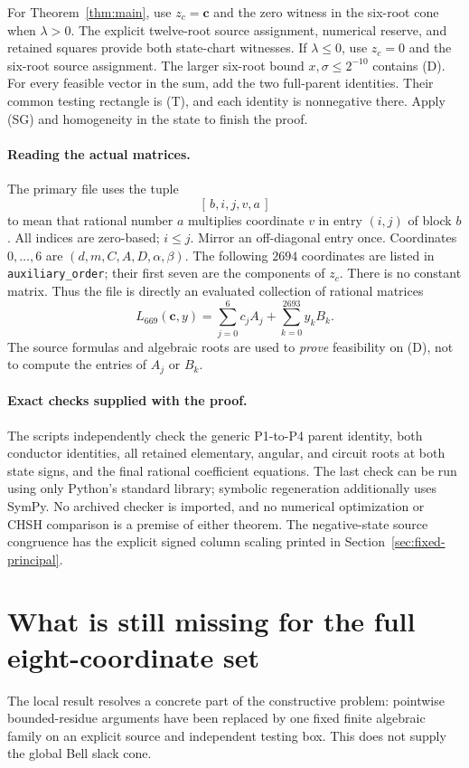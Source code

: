 For Theorem~\ref{thm:main}, use $z_c=\mathbf c$ and the zero witness
in the six-root cone when $\lambda>0$. The explicit twelve-root
source assignment, numerical reserve, and retained squares provide
both state-chart witnesses. If $\lambda\le0$, use $z_c=0$ and the
six-root source assignment. The larger six-root bound
$x,\sigma\le2^{-10}$ contains (D). For every feasible vector in the
sum, add the two full-parent identities. Their common testing
rectangle is (T), and each identity is nonnegative there. Apply
(SG) and homogeneity in the state to finish the proof.

\paragraph{Reading the actual matrices.}
The primary file uses the tuple
\[
 [\,b,i,j,v,a\,]
\]
to mean that rational number $a$ multiplies coordinate $v$ in
entry $(i,j)$ of block $b$. All indices are zero-based; $i\le j$.
Mirror an off-diagonal entry once. Coordinates $0,\ldots,6$ are
$(d,m,C,A,D,\alpha,\beta)$. The following $2694$ coordinates are
listed in \texttt{auxiliary\_order}; their first seven are the
components of $z_c$. There is no constant matrix. Thus the file is
directly an evaluated collection of rational matrices
\[
 L_{669}(\mathbf c,y)=
 \sum_{j=0}^6c_jA_j+\sum_{k=0}^{2693}y_kB_k.
\]
The source formulas and algebraic roots are used to \emph{prove}
feasibility on (D), not to compute the entries of $A_j$ or $B_k$.

\paragraph{Exact checks supplied with the proof.}
The scripts independently check the generic P1-to-P4 parent
identity, both conductor identities, all retained elementary,
angular, and circuit roots at both state signs, and the final
rational coefficient equations. The last check can be run using
only Python's standard library; symbolic regeneration additionally
uses SymPy. No archived checker is imported, and no numerical
optimization or CHSH comparison is a premise of either theorem.
The negative-state source congruence has the explicit signed
column scaling printed in Section~\ref{sec:fixed-principal}.

\section{What is still missing for the full eight-coordinate set}
The local result resolves a concrete part of the constructive
problem: pointwise bounded-residue arguments have been replaced
by one fixed finite algebraic family on an explicit source and
independent testing box. This does not supply the global Bell
slack cone.

